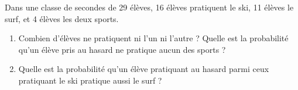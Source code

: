 \documentclass[12pt]{article}
\begin{document}
\dotfill
{}
\dotfill
\dotfill
{}
\dotfill
\dotfill
{}
\dotfill
{}

\begin{activite}Dans une classe de secondes de 29 élèves, 16 élèves pratiquent le ski, 11 élèves le surf, et 4 élèves les deux sports.
  \begin{enumerate}
    \item Combien d'élèves ne pratiquent ni l'un ni l'autre ? Quelle est la probabilité qu'un élève pris au hasard ne pratique aucun des sports ?
    \item Quelle est la probabilité qu'un élève pratiquant au hasard parmi ceux pratiquant le ski pratique aussi le surf ?
  \end{enumerate}
\end{activite}
\end{document}
